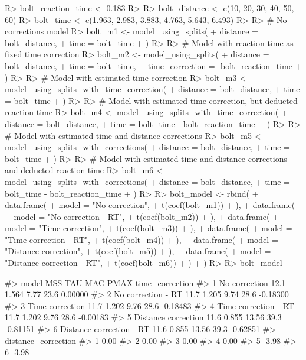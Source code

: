 \documentclass[
]{jss}
\begin{document}
\begin{CodeChunk}
\begin{CodeInput}
R> bolt_reaction_time <- 0.183
R> 
R> bolt_distance <- c(10, 20, 30, 40, 50, 60)
R> bolt_time <- c(1.963, 2.983, 3.883, 4.763, 5.643, 6.493)
R> 
R> # No corrections model
R> bolt_m1 <- model_using_splits(
+   distance = bolt_distance,
+   time = bolt_time
+ )
R> 
R> # Model with reaction time as fixed time correction
R> bolt_m2 <- model_using_splits(
+   distance = bolt_distance,
+   time = bolt_time,
+   time_correction = -bolt_reaction_time
+ )
R> 
R> # Model with estimated time correction
R> bolt_m3 <- model_using_splits_with_time_correction(
+   distance = bolt_distance,
+   time = bolt_time
+ )
R> 
R> # Model with estimated time correction, but deducted reaction time
R> bolt_m4 <- model_using_splits_with_time_correction(
+   distance = bolt_distance,
+   time = bolt_time - bolt_reaction_time
+ )
R> 
R> # Model with estimated time and distance corrections
R> bolt_m5 <- model_using_splits_with_corrections(
+   distance = bolt_distance,
+   time = bolt_time
+ )
R> 
R> # Model with estimated time and distance corrections and deducted reaction time
R> bolt_m6 <- model_using_splits_with_corrections(
+   distance = bolt_distance,
+   time = bolt_time - bolt_reaction_time
+ )
R> 
R> bolt_model <- rbind(
+   data.frame(
+     model = "No correction",
+     t(coef(bolt_m1))
+   ),
+   data.frame(
+     model = "No correction - RT",
+     t(coef(bolt_m2))
+   ),
+   data.frame(
+     model = "Time correction",
+     t(coef(bolt_m3))
+   ),
+   data.frame(
+     model = "Time correction - RT",
+     t(coef(bolt_m4))
+   ),
+   data.frame(
+     model = "Distance correction",
+     t(coef(bolt_m5))
+   ),
+   data.frame(
+     model = "Distance correction - RT",
+     t(coef(bolt_m6))
+   )
+ )
R> 
R> bolt_model
\end{CodeInput}
\begin{CodeOutput}
#>                      model  MSS   TAU   MAC PMAX time_correction
#> 1            No correction 12.1 1.564  7.77 23.6         0.00000
#> 2       No correction - RT 11.7 1.205  9.74 28.6        -0.18300
#> 3          Time correction 11.7 1.202  9.76 28.6        -0.18483
#> 4     Time correction - RT 11.7 1.202  9.76 28.6        -0.00183
#> 5      Distance correction 11.6 0.855 13.56 39.3        -0.81151
#> 6 Distance correction - RT 11.6 0.855 13.56 39.3        -0.62851
#>   distance_correction
#> 1                0.00
#> 2                0.00
#> 3                0.00
#> 4                0.00
#> 5               -3.98
#> 6               -3.98
\end{CodeOutput}
\end{CodeChunk}
\end{document}
